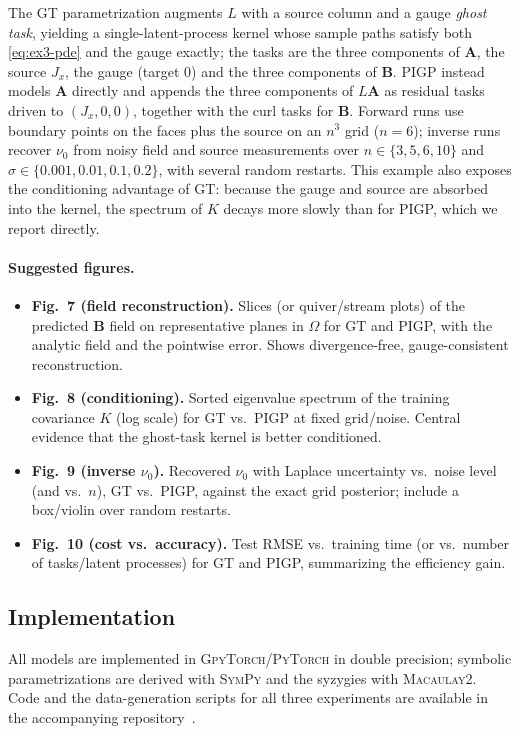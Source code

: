 The GT parametrization augments $L$ with a source column and a gauge
\emph{ghost task}, yielding a single-latent-process kernel whose
sample paths satisfy both \eqref{eq:ex3-pde} and the gauge exactly; the
tasks are the three components of $\bm{A}$, the source $J_x$, the gauge
(target $0$) and the three components of $\bm{B}$.  PIGP instead models
$\bm{A}$ directly and appends the three components of $L\bm{A}$ as
residual tasks driven to $(J_x,0,0)$, together with the curl tasks for
$\bm{B}$.  Forward runs use boundary points on the faces plus the source
on an $n^3$ grid ($n=6$); inverse runs recover $\nu_0$ from noisy
field and source measurements over $n\in\{3,5,6,10\}$ and
$\sigma\in\{0.001,0.01,0.1,0.2\}$, with several random restarts.  This
example also exposes the conditioning advantage of GT: because the gauge
and source are absorbed into the kernel, the spectrum of $K$ decays more
slowly than for PIGP, which we report directly.

\paragraph{Suggested figures.}
\begin{itemize}
  \item \textbf{Fig.~7 (field reconstruction).} Slices (or quiver/stream
        plots) of the predicted $\bm{B}$ field on representative planes
        in $\Omega$ for GT and PIGP, with the analytic field and the
        pointwise error. Shows divergence-free, gauge-consistent
        reconstruction.
  \item \textbf{Fig.~8 (conditioning).} Sorted eigenvalue spectrum of the
        training covariance $K$ (log scale) for GT vs.\ PIGP at fixed
        grid/noise. Central evidence that the ghost-task kernel is
        better conditioned.
  \item \textbf{Fig.~9 (inverse $\nu_0$).} Recovered $\nu_0$ with Laplace
        uncertainty vs.\ noise level (and vs.\ $n$), GT vs.\ PIGP,
        against the exact grid posterior; include a box/violin over
        random restarts.
  \item \textbf{Fig.~10 (cost vs.\ accuracy).} Test RMSE vs.\ training
        time (or vs.\ number of tasks/latent processes) for GT and PIGP,
        summarizing the efficiency gain.
\end{itemize}

\subsection{Implementation}
All models are implemented in \textsc{GpyTorch}/\textsc{PyTorch} in
double precision; symbolic parametrizations are derived with
\textsc{SymPy} and the syzygies with \textsc{Macaulay2}.  Code and the
data-generation scripts for all three experiments are available
in the accompanying repository~\cite{XXX_repo}.
